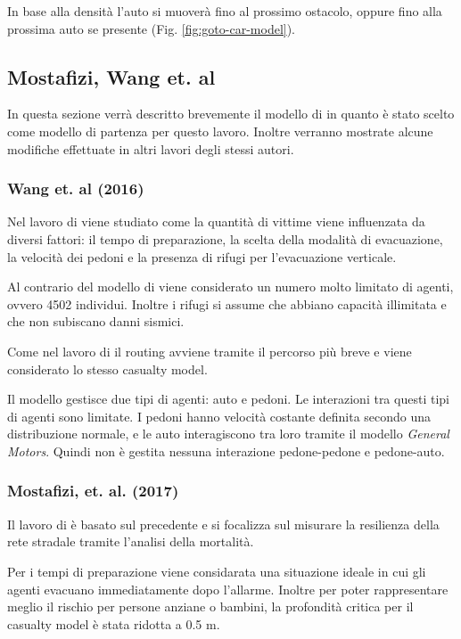 In base alla densità l'auto si muoverà fino al prossimo ostacolo, oppure fino alla prossima auto se presente (Fig. \ref{fig:goto-car-model}).

\subsection{Mostafizi, Wang et. al}
In questa sezione verrà descritto brevemente il modello di \textcite{wang2016agent} in quanto è stato scelto come modello di partenza per questo lavoro.
Inoltre verranno mostrate alcune modifiche effettuate in altri lavori degli stessi autori.

\subsubsection*{Wang et. al (2016)}

Nel lavoro di \textcite{wang2016agent} viene studiato come la quantità di vittime viene influenzata da diversi fattori:
il tempo di preparazione, la scelta della modalità di evacuazione, la velocità dei pedoni e la 
presenza di rifugi per l'evacuazione verticale.

Al contrario del modello di \textcite{goto2012tsunami} viene considerato un numero molto limitato di agenti, ovvero 4502 individui. 
Inoltre i rifugi si assume che abbiano capacità illimitata e che non subiscano danni sismici. 

Come nel lavoro di \textcite{goto2012tsunami} il routing avviene tramite il percorso più breve e viene considerato lo stesso casualty model.

Il modello gestisce due tipi di agenti: auto e pedoni. Le interazioni tra questi tipi di agenti sono limitate.
I pedoni hanno velocità costante definita secondo una distribuzione normale, e le auto interagiscono tra loro 
tramite il modello \textit{General Motors}. Quindi non è gestita nessuna interazione pedone-pedone e pedone-auto.


\subsubsection*{Mostafizi, et. al. (2017)}
Il lavoro di \textcite{mostafizi2017agent} è basato sul precedente e si focalizza sul misurare la resilienza della rete stradale tramite l'analisi della mortalità.

Per i tempi di preparazione viene considarata una situazione ideale in cui gli agenti evacuano immediatamente dopo l'allarme. Inoltre per poter rappresentare
meglio il rischio per persone anziane o bambini, la profondità critica per il casualty model è stata ridotta a 0.5 m.

